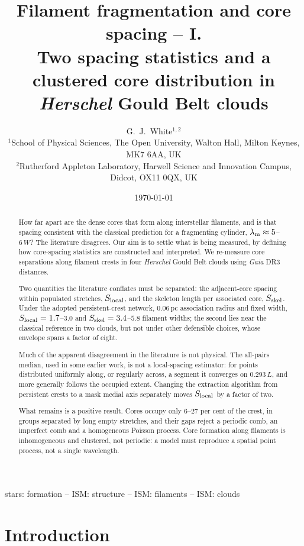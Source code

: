 \documentclass[usenatbib,twoside,twocolumn]{mnras}
\title[Filament fragmentation and core spacing -- I]{Filament fragmentation and core spacing -- I.\\ Two spacing statistics and a clustered core distribution in \textit{Herschel} Gould Belt clouds}
\author[G.~J.~White]{G.~J.~White$^{1,2}$\\
$^{1}$School of Physical Sciences, The Open University, Walton Hall, Milton Keynes, MK7 6AA, UK\\
$^{2}$Rutherford Appleton Laboratory, Harwell Science and Innovation Campus, Didcot, OX11 0QX, UK}
\date{\today}
\begin{document}
\label{firstpage}
\maketitle

\begin{abstract}

How far apart are the dense cores that form along interstellar filaments, and is that spacing consistent with the classical prediction for a fragmenting cylinder, $\lambda_{\rm m}\approx5$--$6\,W$? The literature disagrees. Our aim is to settle what is being measured, by defining how core-spacing statistics are constructed and interpreted. We re-measure core separations along filament crests in four \textit{Herschel} Gould Belt clouds using \textit{Gaia} DR3 distances.

Two quantities the literature conflates must be separated: the adjacent-core spacing within populated stretches, $S_{\rm local}$, and the skeleton length per associated core, $S_{\rm skel}$. Under the adopted persistent-crest network, $0.06$\,pc association radius and fixed width, $S_{\rm local}=1.7$--$3.0$ and $S_{\rm skel}=3.4$--$5.8$ filament widths; the second lies near the classical reference in two clouds, but not under other defensible choices, whose envelope spans a factor of eight.

Much of the apparent disagreement in the literature is not physical. The all-pairs median, used in some earlier work, is not a local-spacing estimator: for points distributed uniformly along, or regularly across, a segment it converges on $0.293\,L$, and more generally follows the occupied extent. Changing the extraction algorithm from persistent crests to a mask medial axis separately moves $S_{\rm local}$ by a factor of two.

What remains is a positive result. Cores occupy only $6$--$27$ per cent of the crest, in groups separated by long empty stretches, and their gaps reject a periodic comb, an imperfect comb and a homogeneous Poisson process. Core formation along filaments is inhomogeneous and clustered, not periodic: a model must reproduce a spatial point process, not a single wavelength.

\end{abstract}

\begin{keywords}
stars: formation -- ISM: structure -- ISM: filaments -- ISM: clouds
\end{keywords}

\section{Introduction}
\label{sec:intro}
\end{document}
